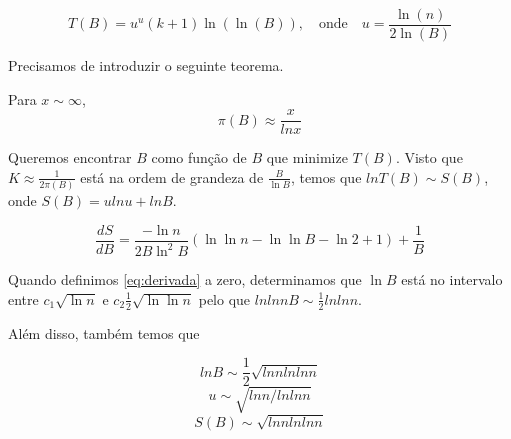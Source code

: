$$T(B) = u^u(k+1)\ln(\ln(B)), \quad \text{onde} \quad u = \frac{\ln(n)}{2\ln(B)}$$

Precisamos de introduzir o seguinte teorema.

\begin{teorema}  Para $x \sim \infty
$,
$$\pi(B)\approx \frac{x}{lnx}$$
\end{teorema}

Queremos encontrar \(B\) como função de \(B\) que minimize $T(B)$. Visto que \(K \approx \frac{1}{2\pi(B)}\) está na ordem de grandeza de \(\frac{B}{\ln B}\), temos que $lnT(B) \sim S(B)$, onde $S(B)=ulnu + lnB$.

\begin{equation}
\frac{dS}{dB} = \frac{-\ln{n}}{2B\ln^2{B}}(\ln{\ln{n}} - \ln{\ln{B}} - \ln{2} + 1) + \frac{1}{B}
\label{eq:derivada}
\end{equation}

Quando definimos \eqref{eq:derivada} a zero, determinamos que \( \ln B \) está no intervalo entre \( c_1\sqrt{\ln n} \) e \( c_2\frac{1}{2}\sqrt{\ln\ln n} \) pelo que $lnlnnB \sim \frac{1}{2}lnln n$. 

Além disso, também temos que

$$lnB \sim \frac{1}{2}\sqrt{lnnlnlnn}$$
$$u \sim \sqrt{lnn/lnlnn}$$
$$S(B) \sim \sqrt{lnnlnlnn}$$



